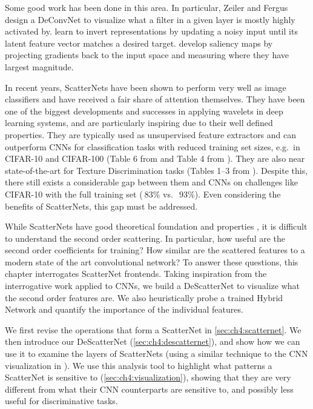 Some good work has been done in this area. In particular,
Zeiler and Fergus \cite{zeiler_visualizing_2014} 
design a DeConvNet to visualize what a filter in a given layer is mostly highly
activated by. \cite{mahendran_understanding_2015} learn to invert
representations by updating a noisy input until its latent feature vector
matches a desired target. \cite{simonyan_deep_2014} develop saliency maps by
projecting gradients back to the input space and measuring where they have
largest magnitude.

In recent years, ScatterNets have been shown to perform very well as image
classifiers and have received a fair share of attention themselves. They have
been one of the biggest developments and successes in applying wavelets in
deep learning systems, and are particularly inspiring due to their well defined
properties.  They are typically used as unsupervised feature extractors
\cite{bruna_invariant_2013, oyallon_deep_2015, 
singh_dual-tree_2017, singh_multi-resolution_2016} and 
can outperform CNNs for classification tasks with reduced
training set sizes, e.g.\ in CIFAR-10 and CIFAR-100 (Table 6 from
\cite{oyallon_scaling_2017} and Table 4 from \cite{singh_dual-tree_2017}).  
They are also near state-of-the-art for Texture Discrimination tasks
(Tables 1--3 from \cite{sifre_rotation_2013}). Despite this, there still exists
a considerable gap between them and CNNs on challenges like CIFAR-10 with the
full training set ($~83\%$ vs.\ $~93\%$). Even considering the benefits of
ScatterNets, this gap must be addressed.

While ScatterNets have good theoretical foundation and properties
\cite{mallat_group_2012}, it is difficult to understand the second order
scattering. In particular, how useful are the second order coefficients for
training? How similar are the scattered features to a modern state of the art
convolutional network? To answer these questions, this chapter interrogates
ScatterNet frontends. Taking inspiration from the interrogative work applied to
CNNs, we build a DeScatterNet to visualize what the second order features are.
We also heuristically probe a trained Hybrid Network and quantify the importance
of the individual features.

We first revise the operations that form a ScatterNet in
\autoref{sec:ch4:scatternet}. We then introduce our DeScatterNet
(\autoref{sec:ch4:descatternet}), and show how we can use it to examine the
layers of ScatterNets (using a similar technique to the CNN visualization in
\cite{zeiler_visualizing_2014}). We use this analysis tool to highlight what
patterns a ScatterNet is sensitive to (\autoref{sec:ch4:visualization}), showing
that they are very different from what their CNN counterparts are sensitive to,
and possibly less useful for discriminative tasks. 

